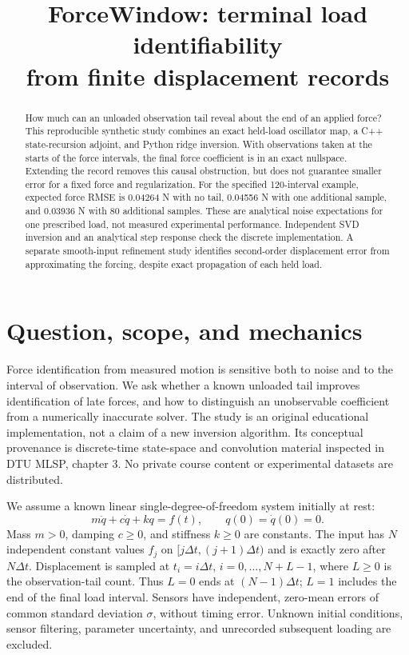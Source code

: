 \documentclass[10pt,a4paper]{article}
\title{ForceWindow: terminal load identifiability\\from finite displacement records}
\author{}
\date{}
\begin{document}
\maketitle
\vspace{-12mm}
\begin{abstract}
How much can an unloaded observation tail reveal about the end of an applied force?
This reproducible synthetic study combines an exact held-load oscillator map,
a C++ state-recursion adjoint, and Python ridge inversion. With observations
taken at the starts of the force intervals, the final force coefficient is
in an exact nullspace. Extending the record removes this causal obstruction,
but does not guarantee smaller error for a fixed force and regularization.
For the specified 120-interval example, expected force RMSE is 0.04264 N with
no tail, 0.04556 N with one additional sample, and 0.03936 N with 80 additional
samples. These are analytical noise expectations for one prescribed load,
not measured experimental performance. Independent SVD inversion and an
analytical step response check the discrete implementation. A separate
smooth-input refinement study identifies second-order displacement error
from approximating the forcing, despite exact propagation of each held load.
\end{abstract}

\section{Question, scope, and mechanics}
Force identification from measured motion is sensitive both to noise and to
the interval of observation. We ask whether a known unloaded tail improves
identification of late forces, and how to distinguish an unobservable
coefficient from a numerically inaccurate solver. The study is an original
educational implementation, not a claim of a new inversion algorithm.
Its conceptual provenance is discrete-time state-space and convolution
material inspected in DTU MLSP, chapter 3. No private course content or
experimental datasets are distributed.

We assume a known linear single-degree-of-freedom system initially at rest:
\begin{equation}
 m\ddot q+c\dot q+kq=f(t),\qquad q(0)=\dot q(0)=0.
 \label{eq:mechanics}
\end{equation}
Mass $m>0$, damping $c\geq0$, and stiffness $k\geq0$ are constants.
The input has $N$ independent constant values $f_j$ on
$[j\Delta t,(j+1)\Delta t)$ and is exactly zero after $N\Delta t$.
Displacement is sampled at $t_i=i\Delta t$, $i=0,\ldots,N+L-1$,
where $L\geq0$ is the observation-tail count. Thus $L=0$ ends at
$(N-1)\Delta t$; $L=1$ includes the end of the final load interval.
Sensors have independent, zero-mean errors of common standard deviation
$\sigma$, without timing error. Unknown initial conditions, sensor filtering,
parameter uncertainty, and unrecorded subsequent loading are excluded.
\end{document}
